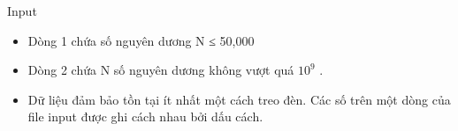 Input
\begin{itemize}
	\item     Dòng 1 chứa số nguyên dương N ≤ 50,000   
	\item     Dòng 2 chứa N số nguyên dương không vượt quá $10^{9}$    .   
	\item     Dữ liệu đảm bảo tồn tại ít nhất một cách treo đèn. Các số trên một dòng của file input được ghi cách nhau bởi dấu cách.   
\end{itemize}